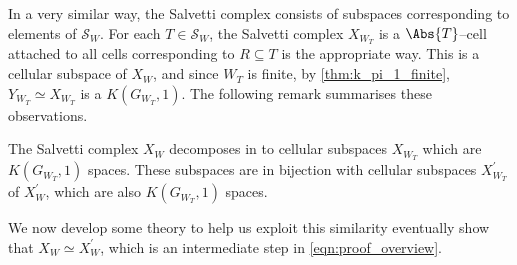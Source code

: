 \documentclass[class=article, crop=false]{standalone}
\begin{document}
In a very similar way, the Salvetti complex consists of subspaces corresponding to elements of $\mathcal{S}_W$. For each $T \in \mathcal{S}_W$, the Salvetti complex $X_{W_T}$ is a $\Abs{T}$--cell attached to all cells corresponding to $R \subseteq T$ is the appropriate way. This is a cellular subspace of $X_W$, and since $W_T$ is finite, by \cref{thm:k_pi_1_finite}, $Y_{W_T} \simeq X_{W_T}$ is a $K(G_{W_T},1)$. The following remark summarises these observations.

\begin{remark}
    The Salvetti complex $X_W$ decomposes in to cellular subspaces $X_{W_T}$ which are $K(G_{W_T},1)$ spaces. These subspaces are in bijection with cellular subspaces $X^\prime_{W_T}$ of $X^\prime_W$, which are also $K(G_{W_T},1)$ spaces.
    \label{rmk:salvetti_X_prime_similarities}
\end{remark}

We now develop some theory to help us exploit this similarity eventually show that $X_W \simeq X^\prime_{W}$, which is an intermediate step in \eqref{eqn:proof_overview}.
\end{document}
